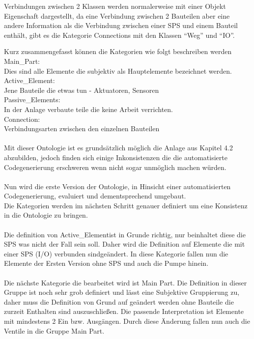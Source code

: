 Verbindungen zwischen 2 Klassen werden normalerweise mit einer Objekt Eigenschaft dargestellt, da eine Verbindung zwischen 2 Bauteilen aber eine andere Information als die Verbindung zwischen einer SPS und einem Bauteil enthält, gibt es die Kategorie Connections mit den Klassen “Weg” und “IO”.

Kurz zusammengefasst können die Kategorien wie folgt beschreiben werden\\
Main\_Part:\\
	Dies sind alle Elemente die subjektiv als Hauptelemente bezeichnet werden.\\
Active\_Element:\\
	Jene Bauteile die etwas tun - Aktuatoren, Sensoren\\
Passive\_Elements:\\
	In der Anlage verbaute teile die keine Arbeit verrichten.\\ 
Connection:\\
	Verbindungsarten zwischen den einzelnen Bauteilen\\
\\
Mit dieser Ontologie ist es grundsätzlich möglich die Anlage aus Kapitel 4.2 abzubilden, jedoch finden sich einige Inkonsistenzen die die automatisierte Codegenerierung erschweren wenn nicht sogar unmöglich machen würden.\\
\\
Nun wird die erste Version der Ontologie, in Hinsicht einer automatisierten Codegenerierung, evaluiert und dementsprechend umgebaut.\\
Die Kategorien werden im nächsten Schritt genauer definiert um eine Konsistenz in die Ontologie zu bringen.\\
\\
Die definition von \glqq Active\_Element\grqq\space ist in Grunde richtig, nur beinhaltet diese die SPS was nicht der Fall sein soll. Daher wird die Definition auf \glqq Elemente die mit einer SPS (I/O) verbunden sind\grqq\space geändert. In diese Kategorie fallen nun die Elemente der Ersten Version ohne SPS und auch die Pumpe hinein.\\
\\
Die nächste Kategorie die bearbeitet wird ist \glqq Main Part\grqq\space. Die Definition in dieser Gruppe ist noch sehr grob definiert und lässt eine Subjektive Gruppierung zu, daher muss die Definition von Grund auf geändert werden ohne Bauteile die zurzeit Enthalten sind auszuschließen. Die passende Interpretation ist \glqq Elemente mit mindestens 2 Ein bzw. Ausgängen\grqq\space. Durch diese Änderung fallen nun auch die Ventile in die Gruppe \glqq Main Part\grqq\space.\\
